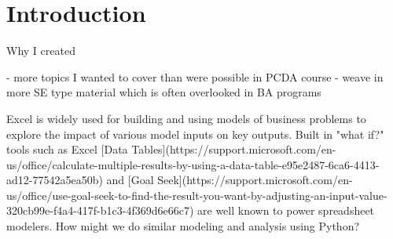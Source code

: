 \documentclass[ited,blindrev]{informs3}              %
\begin{document}
%


\section{Introduction}


Why I created 

- more topics I wanted to cover than were possible in PCDA course
- weave in more SE type material which is often overlooked in BA programs

Excel is widely used for building and using models of business problems to explore the impact of various model inputs on key outputs. Built in "what if?" tools such as Excel [Data Tables](https://support.microsoft.com/en-us/office/calculate-multiple-results-by-using-a-data-table-e95e2487-6ca6-4413-ad12-77542a5ea50b) and [Goal Seek](https://support.microsoft.com/en-us/office/use-goal-seek-to-find-the-result-you-want-by-adjusting-an-input-value-320cb99e-f4a4-417f-b1c3-4f369d6e66c7) are well known to power spreadsheet modelers. How might we do similar modeling and analysis using Python?
\end{document}

